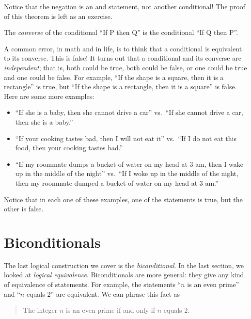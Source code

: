 \documentclass{tufte-book}
\begin{document}
Notice that the negation is an and statement, not another conditional! The proof of this theorem is left as an exercise.

\begin{definition}
  The \emph{converse} of the conditional ``If P then Q'' is the conditional ``If Q then P''.
\end{definition}

A common error, in math and in life, is to think that a conditional is equivalent to its converse. This is false! It turns out that a conditional and its converse are \emph{independent}; that is, both could be true, both could be false, or one could be true and one could be false. For example, ``If the shape is a square, then it is a rectangle'' is true, but ``If the shape is a rectangle, then it is a square'' is false.  Here are some more examples:
\begin{itemize}
    \item ``If she is a baby, then she cannot drive a car'' vs.\ ``If she cannot drive a car, then she is a baby.''
    \item ``If your cooking tastes bad, then I will not eat it'' vs.\ ``If I do not eat this food, then your cooking tastes bad.''
    \item ``If my roommate dumps a bucket of water on my head at 3 am, then I wake up in the middle of the night'' vs.\ ``If I woke up in the middle of the night, then my roommate dumped a bucket of water on my head at 3 am.''
\end{itemize}

Notice that in each one of these examples, one of the statements is true, but the other is false.



\section{Biconditionals}
\label{sec:biconditionals}

The last logical construction we cover is the \emph{biconditional}. In the last section, we looked at \emph{logical equivalence}. Biconditionals are more general: they give any kind of equivalence of statements. For example, the statements ``$n$ is an even prime'' and ``$n$ equals $2$'' are equivalent. We can phrase this fact as
\begin{quote}
  The integer $n$ is an even prime if and only if $n$ equals $2$.
\end{quote}
\end{document}
